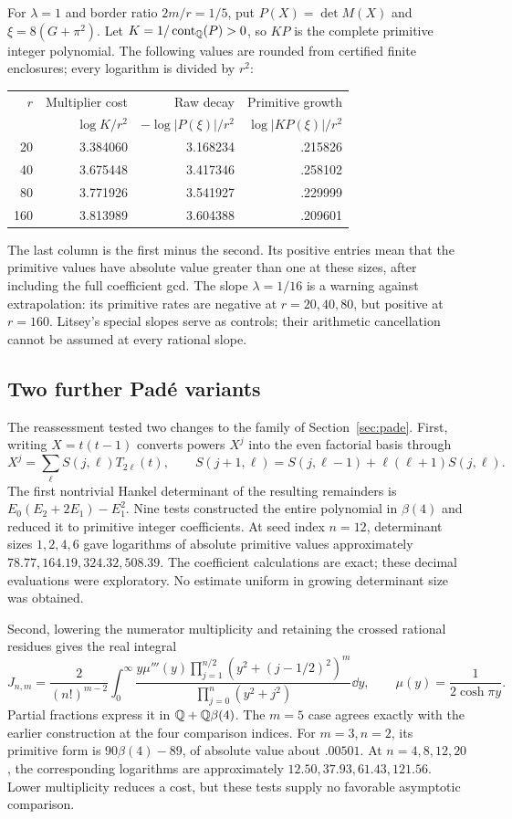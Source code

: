 For $\lambda=1$ and border ratio $2m/r=1/5$, put
$P(X)=\det M(X)$ and $\xi=8(G+\pi^2)$. Let
$K=1/\operatorname{cont}_{\mathbb Q}(P)>0$, so $KP$ is the complete primitive integer polynomial.
The following values are rounded from certified finite enclosures;
every logarithm is divided by $r^2$:
\begin{center}
\begin{tabular}{rrrr}
\toprule
$r$&Multiplier cost&Raw decay&Primitive growth\\
&$\log K/r^2$&$-\log|P(\xi)|/r^2$&$\log|KP(\xi)|/r^2$\\
\midrule
20&3.384060&3.168234&.215826\\
40&3.675448&3.417346&.258102\\
80&3.771926&3.541927&.229999\\
160&3.813989&3.604388&.209601\\
\bottomrule
\end{tabular}
\end{center}
The last column is the first minus the second. Its positive entries
mean that the primitive values have absolute value greater than one at
these sizes, after including the full coefficient gcd.
The slope $\lambda=1/16$ is a warning against
extrapolation: its primitive rates are negative at $r=20,40,80$,
but positive at $r=160$. Litsey's special slopes serve as controls;
their arithmetic cancellation cannot be assumed at every rational slope.

\subsection{Two further Pad\'e variants}

The reassessment  tested two changes to the family of
Section~\ref{sec:pade}. First, writing $X=t(t-1)$ converts powers
$X^j$ into the even factorial basis through
\[
 X^j=\sum_\ell S(j,\ell)T_{2\ell}(t),\qquad
 S(j+1,\ell)=S(j,\ell-1)+\ell(\ell+1)S(j,\ell).
\]
The first nontrivial Hankel determinant of the resulting remainders is
$E_0(E_2+2E_1)-E_1^2$. Nine tests constructed the entire polynomial
in $\beta(4)$ and reduced it to primitive integer coefficients.
At seed index $n=12$, determinant sizes $1,2,4,6$ gave logarithms
of absolute primitive values approximately $78.77,164.19,324.32,508.39$.
The coefficient calculations are exact; these decimal evaluations
were exploratory. No estimate uniform in growing determinant size
was obtained.

Second, lowering the numerator multiplicity and retaining the crossed
rational residues gives the real integral
\[
 J_{n,m}=\frac2{(n!)^{m-2}}\int_0^\infty
 \frac{y\mu'''(y)\prod_{j=1}^{n/2}(y^2+(j-1/2)^2)^m}
      {\prod_{j=0}^n(y^2+j^2)}\dd y,
 \qquad \mu(y)=\frac1{2\cosh\pi y}.
\]
Partial fractions express it in $\mathbb Q+\mathbb Q\beta(4)$. The $m=5$ case
agrees exactly with the earlier construction at the four comparison
indices. For $m=3,n=2$, its primitive form is
$90\beta(4)-89$, of absolute value about $.00501$. At $n=4,8,12,20$,
the corresponding logarithms are approximately $12.50,37.93,61.43,121.56$.
Lower multiplicity reduces a cost, but these tests supply no favorable
asymptotic comparison.
